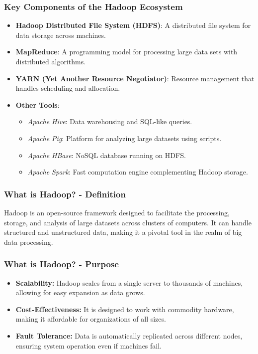 \documentclass[aspectratio=169]{beamer}
\begin{document}
\begin{frame}[fragile]
    \frametitle{Key Components of the Hadoop Ecosystem}
    \begin{itemize}
        \item \textbf{Hadoop Distributed File System (HDFS)}: A distributed file system for data storage across machines.
        \item \textbf{MapReduce}: A programming model for processing large data sets with distributed algorithms.
        \item \textbf{YARN (Yet Another Resource Negotiator)}: Resource management that handles scheduling and allocation.
        \item \textbf{Other Tools}:
            \begin{itemize}
                \item \textit{Apache Hive}: Data warehousing and SQL-like queries.
                \item \textit{Apache Pig}: Platform for analyzing large datasets using scripts.
                \item \textit{Apache HBase}: NoSQL database running on HDFS.
                \item \textit{Apache Spark}: Fast computation engine complementing Hadoop storage.
            \end{itemize}
    \end{itemize}
\end{frame}

\begin{frame}[fragile]
    \frametitle{What is Hadoop? - Definition}
    Hadoop is an open-source framework designed to facilitate the processing, storage, and analysis of large datasets across clusters of computers. It can handle structured and unstructured data, making it a pivotal tool in the realm of big data processing.
\end{frame}

\begin{frame}[fragile]
    \frametitle{What is Hadoop? - Purpose}
    \begin{itemize}
        \item \textbf{Scalability:} Hadoop scales from a single server to thousands of machines, allowing for easy expansion as data grows.
        \item \textbf{Cost-Effectiveness:} It is designed to work with commodity hardware, making it affordable for organizations of all sizes.
        \item \textbf{Fault Tolerance:} Data is automatically replicated across different nodes, ensuring system operation even if machines fail.
    \end{itemize}
\end{frame}
\end{document}
